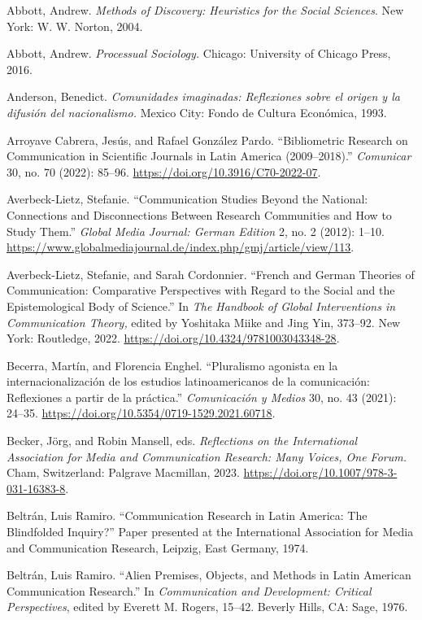 \documentclass{tufte-handout}
\begin{document}
\begin{hangparas}{.25in}{1} 



Abbott, Andrew. \emph{Methods of Discovery: Heuristics for the Social
Sciences}. New York: W. W. Norton, 2004.

Abbott, Andrew. \emph{Processual Sociology.} Chicago: University of
Chicago Press, 2016.

Anderson, Benedict. \emph{Comunidades imaginadas: Reflexiones sobre el
origen y la difusión del nacionalismo.} Mexico City: Fondo de Cultura
Económica, 1993.

Arroyave Cabrera, Jesús, and Rafael González Pardo. ``Bibliometric
Research on Communication in Scientific Journals in Latin America
(2009--2018).'' \emph{Comunicar} 30, no. 70 (2022): 85--96.
\url{https://doi.org/10.3916/C70-2022-07}.

Averbeck-Lietz, Stefanie. ``Communication Studies Beyond the National:
Connections and Disconnections Between Research Communities and How to
Study Them.'' \emph{Global Media Journal: German Edition} 2, no. 2
(2012): 1--10.
\url{https://www.globalmediajournal.de/index.php/gmj/article/view/113}.

Averbeck-Lietz, Stefanie, and Sarah Cordonnier. ``French and German
Theories of Communication: Comparative Perspectives with Regard to the
Social and the Epistemological Body of Science.'' In \emph{The Handbook
of Global Interventions in Communication Theory,} edited by Yoshitaka
Miike and Jing Yin, 373--92. New York: Routledge, 2022.
\url{https://doi.org/10.4324/9781003043348-28}.

Becerra, Martín, and Florencia Enghel. ``Pluralismo agonista en la
internacionalización de los estudios latinoamericanos de la
comunicación: Reflexiones a partir de la práctica.'' \emph{Comunicación
y Medios} 30, no. 43 (2021): 24--35.
\url{https://doi.org/10.5354/0719-1529.2021.60718}.

Becker, Jörg, and Robin Mansell, eds. \emph{Reflections on the
International Association for Media and Communication Research: Many
Voices, One Forum.} Cham, Switzerland: Palgrave Macmillan, 2023.
\url{https://doi.org/10.1007/978-3-031-16383-8}.

Beltrán, Luis Ramiro. ``Communication Research in Latin America: The
Blindfolded Inquiry?'' Paper presented at the International Association
for Media and Communication Research, Leipzig, East Germany, 1974.

Beltrán, Luis Ramiro. ``Alien Premises, Objects, and Methods in Latin
American Communication Research.'' In \emph{Communication and
Development: Critical Perspectives}, edited by Everett M. Rogers,
15--42. Beverly Hills, CA: Sage, 1976.


\end{hangparas}
\end{document}
